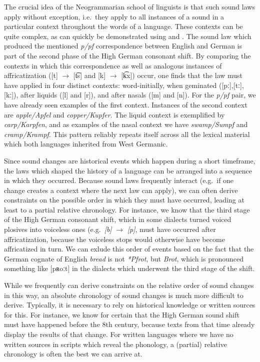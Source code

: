 The crucial idea of the Neogrammarian school of linguists is that such sound laws apply without exception, i.e.\ they apply to all instances of a sound in a particular context throughout the words of a language. These contexts can be quite complex, as can quickly be demonstrated using  and . The sound law which produced the mentioned \textit{p/pf} correspondence between English and German is part of the second phase of the High German consonant shift. By comparing the contexts in which this correspondence as well as analogous instances of affricatization ([t] $\rightarrow$ [t͡s] and [k] $\rightarrow$ [k͡x]) occur, one finds that the law must have applied in four distinct contexts: word-initially, when geminated ([pː],[tː],[kː]), after liquids ([l] and [r]), and after nasals ([m] and [n]). For the \textit{p/pf} pair, we have already seen examples of the first context. Instances of the second context are \textit{apple/Apfel} and \textit{copper/Kupfer}. The liquid context is exemplified by \textit{carp/Karpfen}, and as examples of the nasal context we have \textit{swamp/Sumpf} and \textit{cramp/Krampf}. This pattern reliably repeats itself across all the lexical material which both languages inherited from West Germanic.

Since sound changes are historical events which happen during a short timeframe, the laws which shaped the history of a language can be arranged into a sequence in which they occurred. Because sound laws frequently interact (e.g.\ if one change creates a context where the next law can apply), we can often derive constraints on the possible order in which they must have occurred, leading at least to a partial relative chronology. For instance, we know that the third stage of the High German consonant shift, which in some  dialects turned voiced plosives into voiceless ones (e.g.\ \textit{[b]} $\rightarrow$ \textit{[p]}, must have occurred after affricatization, because the voiceless stops would otherwise have become affricatized in turn. We can exlude this order of events based on the fact that the German cognate of English \textit{bread} is not \textit{*Pfrot}, but \textit{Brot}, which is pronounced something like [pʀoːt] in the dialects which underwent the third stage of the shift.

While we frequently can derive constraints on the relative order of sound changes in this way, an absolute chronology of sound changes is much more difficult to derive. Typically, it is necessary to rely on historical knowledge or written sources for this. For instance, we know for certain that the High German sound shift must have happened before the 8th century, because  texts from that time already display the results of that change. For written languages where we have no written sources in scripts which reveal the phonology, a (partial) relative chronology is often the best we can arrive at.

